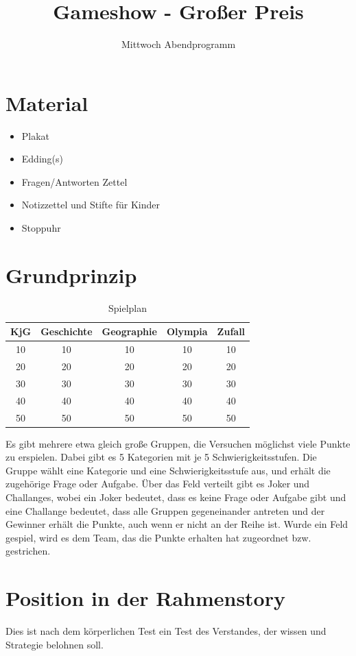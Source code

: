 \documentclass[11pt]{scrartcl}
\title{Gameshow - Großer Preis}
\subtitle{Mittwoch Abendprogramm}
\author{}
\date{}
\begin{document}
\maketitle \thispagestyle{empty}
\section*{Material}
\begin{itemize}
    \item Plakat
    \item Edding(s)
    \item Fragen/Antworten Zettel
    \item Notizzettel und Stifte für Kinder
    \item Stoppuhr
\end{itemize}
\section*{Grundprinzip}
\begin{table}[H]
    \centering
    \begin{tabular}{|c|c|c|c|c|}\hline
        KjG&Geschichte&Geographie&Olympia&Zufall\\\hline
        10&10&10&10&10\\\hline
        20&20&20&20&20\\\hline
        30&30&30&30&30\\\hline
        40&40&40&40&40\\\hline
        50&50&50&50&50\\\hline
    \end{tabular}
    \caption*{Spielplan}
\end{table}
Es gibt mehrere etwa gleich große Gruppen, die Versuchen möglichst viele Punkte zu erspielen. Dabei gibt es 5 Kategorien mit je 5 Schwierigkeitsstufen. Die Gruppe wählt eine Kategorie und eine Schwierigkeitsstufe aus, und erhält die zugehörige Frage oder Aufgabe. Über das Feld verteilt gibt es Joker und Challanges, wobei ein Joker bedeutet, dass es keine Frage oder Aufgabe gibt und eine Challange bedeutet, dass alle Gruppen gegeneinander antreten und der Gewinner erhält die Punkte, auch wenn er nicht an der Reihe ist. Wurde ein Feld gespiel, wird es dem Team, das die Punkte erhalten hat zugeordnet bzw. gestrichen.
\section*{Position in der Rahmenstory} Dies ist nach dem körperlichen Test ein Test des Verstandes, der wissen und Strategie belohnen soll.
\end{document}
